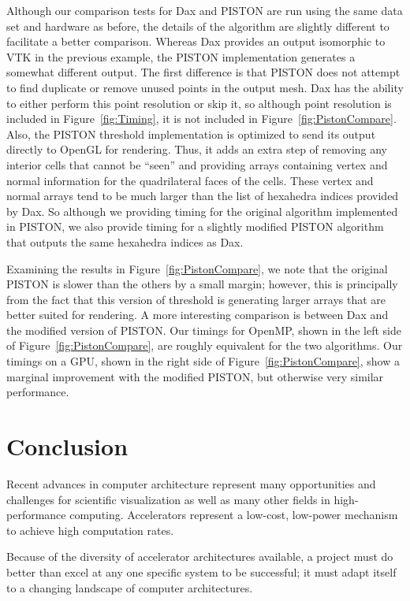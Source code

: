 \documentclass[conference]{IEEEtran}
\begin{document}
Although our comparison tests for Dax and PISTON are run using the same
data set and hardware as before, the details of the algorithm are slightly
different to facilitate a better comparison.  Whereas Dax provides an
output isomorphic to VTK in the previous example, the PISTON implementation
generates a somewhat different output.  The first difference is that PISTON
does not attempt to find duplicate or remove unused points in the output
mesh.  Dax has the ability to either perform this point resolution or skip
it, so although point resolution is included in Figure~\ref{fig:Timing}, it
is not included in Figure~\ref{fig:PistonCompare}.  Also, the PISTON
threshold implementation is optimized to send its output directly to OpenGL
for rendering.  Thus, it adds an extra step of removing any interior cells
that cannot be ``seen'' and providing arrays containing vertex and normal
information for the quadrilateral faces of the cells.  These vertex and
normal arrays tend to be much larger than the list of hexahedra indices
provided by Dax.  So although we providing timing for the original
algorithm implemented in PISTON, we also provide timing for a slightly
modified PISTON algorithm that outputs the same hexahedra indices as Dax.

Examining the results in Figure~\ref{fig:PistonCompare}, we note that the
original PISTON is slower than the others by a small margin; however, this
is principally from the fact that this version of threshold is generating
larger arrays that are better suited for rendering.  A more interesting
comparison is between Dax and the modified version of PISTON.  Our timings
for OpenMP, shown in the left side of Figure~\ref{fig:PistonCompare}, are
roughly equivalent for the two algorithms.  Our timings on a GPU, shown in
the right side of Figure~\ref{fig:PistonCompare}, show a marginal
improvement with the modified PISTON, but otherwise very similar
performance.

\section{Conclusion}
\label{sec:Conclusion}

\noindent
Recent advances in computer architecture represent many opportunities and
challenges for scientific visualization as well as many other fields in
high-performance computing.  Accelerators represent a low-cost, low-power
mechanism to achieve high computation rates.

Because of the diversity of accelerator architectures available, a project
must do better than excel at any one specific system to be successful; it
must adapt itself to a changing landscape of computer architectures.
\end{document}
